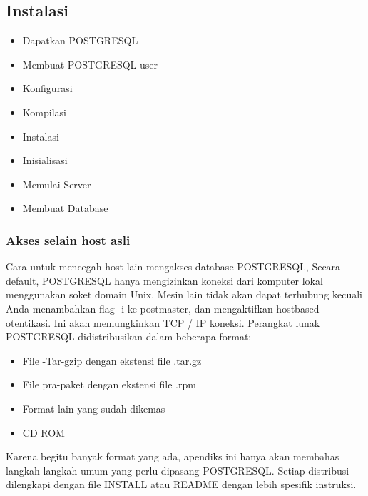 \subsection{Instalasi} 
\begin {itemize}
	\item Dapatkan POSTGRESQL
	\item Membuat POSTGRESQL user
	\item Konfigurasi
	\item Kompilasi
	\item Instalasi
	\item Inisialisasi
	\item Memulai Server
	\item Membuat Database
\end {itemize}

\subsubsection{Akses selain host asli}
Cara untuk mencegah host lain mengakses database POSTGRESQL, Secara default, POSTGRESQL hanya mengizinkan koneksi dari komputer lokal menggunakan soket domain Unix. Mesin lain tidak akan dapat terhubung kecuali Anda menambahkan flag -i ke postmaster, dan mengaktifkan hostbased otentikasi. Ini akan memungkinkan TCP / IP koneksi. Perangkat lunak POSTGRESQL didistribusikan dalam beberapa format:
\begin {itemize}
	\item File -Tar-gzip dengan ekstensi file .tar.gz
	\item File pra-paket dengan ekstensi file .rpm
	\item Format lain yang sudah dikemas
	\item CD ROM
\end {itemize}
Karena begitu banyak format yang ada, apendiks ini hanya akan membahas langkah-langkah umum yang perlu dipasang POSTGRESQL. Setiap distribusi dilengkapi dengan file INSTALL atau README dengan lebih spesifik instruksi.

